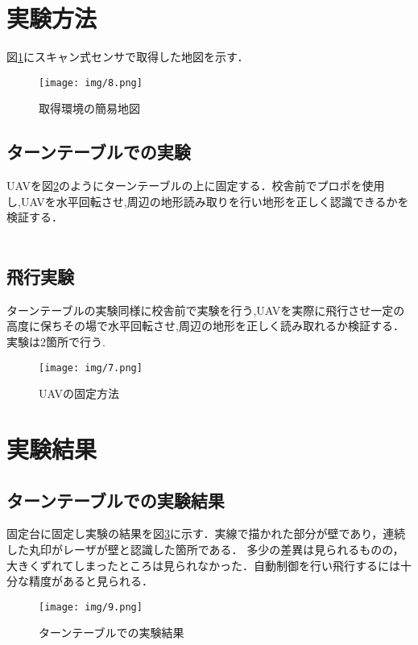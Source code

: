 \documentclass[12pt,oneside]{sotsuken_paper}
\begin{document}
\section{実験方法}図\ref{fig:8}にスキャン式センサで取得した地図を示す．\\

\begin{figure}[H]
\begin{center}
\texttt{[image: img/8.png]}
\end{center}
\caption{取得環境の簡易地図}
\label{fig:8}
\end{figure}

\subsection{ターンテーブルでの実験}UAVを図\ref{fig:7}のようにターンテーブルの上に固定する．校舎前でプロポを使用し,UAVを水平回転させ,周辺の地形読み取りを行い地形を正しく認識できるかを検証する．\\
　
\subsection{飛行実験}ターンテーブルの実験同様に校舎前で実験を行う,UAVを実際に飛行させ一定の高度に保ちその場で水平回転させ,周辺の地形を正しく読み取れるか検証する．実験は2箇所で行う.

\begin{figure}[H]
\begin{center}
\texttt{[image: img/7.png]}
\end{center}
\caption{UAVの固定方法}
\label{fig:7}
\end{figure}



\section{実験結果}
\subsection{ターンテーブルでの実験結果}固定台に固定し実験の結果を図\ref{fig:9}に示す．実線で描かれた部分が壁であり，連続した丸印がレーザが壁と認識した箇所である．
多少の差異は見られるものの，大きくずれてしまったところは見られなかった．自動制御を行い飛行するには十分な精度があると見られる．

\begin{figure}[H]
\begin{center}
\texttt{[image: img/9.png]}
\end{center}
\caption{ターンテーブルでの実験結果}
\label{fig:9}
\end{figure}
\end{document}
